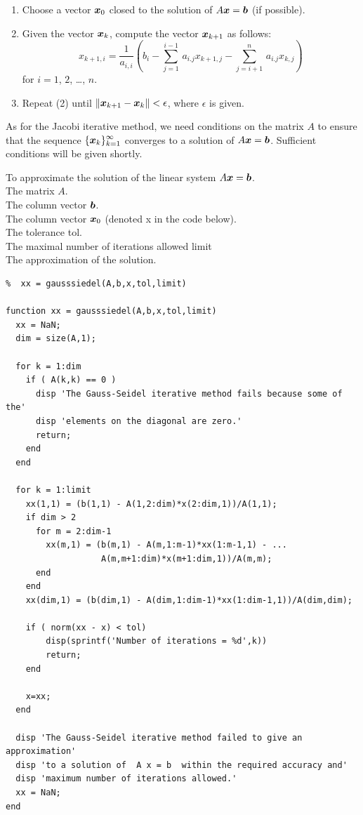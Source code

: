 \begin{algo}
\begin{enumerate}
\item Choose a vector $\bm{x}_{0}$ closed to the solution of
$ A \bm{x} = \bm{b}$ (if possible).
\item Given the vector $\bm{x}_{k}$, compute the vector
$\bm{x}_{k+1}$ as follows:
\begin{equation} \label{formula6}
x_{k+1,i} = \frac{1}{a_{i,i}} \left(b_i -\sum_{j=1}^{i-1}\, a_{i.j}
x_{k+1,j} -\sum_{j=i+1}^{n}\, a_{i.j} x_{k,j} \right)
\end{equation}
for $i = 1$, $2$, \ldots, $n$.
\item Repeat (2) until $\| \bm{x}_{k+1} - \bm{x}_{k} \| < \epsilon$,
where $\epsilon$ is given.
\end{enumerate}
\end{algo}

As for the Jacobi iterative method, we need conditions on the matrix
$A$ to ensure that the sequence $\displaystyle \{\bm{x}_k\}_{k=1}^\infty$
converges to a solution of $A\bm{x} = \bm{b}$.  Sufficient
conditions will be given shortly.

\begin{code}
To approximate the solution of the linear system $A \bm{x} = \bm{b}$.\\
 The matrix $A$.\\
The column vector $\bm{b}$.\\
The column vector $\bm{x}_0$ (denoted x in the code below).\\
The tolerance  tol.\\
The maximal number of iterations allowed  limit\\
 The approximation of the solution.
\small
\begin{verbatim}
%  xx = gausssiedel(A,b,x,tol,limit)

function xx = gausssiedel(A,b,x,tol,limit)
  xx = NaN;
  dim = size(A,1);

  for k = 1:dim
    if ( A(k,k) == 0 )
      disp 'The Gauss-Seidel iterative method fails because some of the'
      disp 'elements on the diagonal are zero.'
      return;
    end
  end

  for k = 1:limit
    xx(1,1) = (b(1,1) - A(1,2:dim)*x(2:dim,1))/A(1,1);
    if dim > 2
      for m = 2:dim-1
        xx(m,1) = (b(m,1) - A(m,1:m-1)*xx(1:m-1,1) - ...
                   A(m,m+1:dim)*x(m+1:dim,1))/A(m,m);
      end
    end
    xx(dim,1) = (b(dim,1) - A(dim,1:dim-1)*xx(1:dim-1,1))/A(dim,dim);

    if ( norm(xx - x) < tol)
        disp(sprintf('Number of iterations = %d',k))
        return;
    end

    x=xx;
  end

  disp 'The Gauss-Seidel iterative method failed to give an approximation'
  disp 'to a solution of  A x = b  within the required accuracy and'
  disp 'maximum number of iterations allowed.'
  xx = NaN;
end
\end{verbatim}
\end{code}

